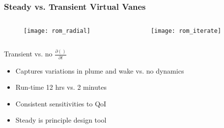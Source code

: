 \documentclass[mathserif]{beamer}
\begin{document}

%
%
\begin{frame}
 \frametitle{Steady vs. Transient Virtual Vanes}

 \begin{columns}[]
  \begin{column}{0.5\linewidth}

    \begin{figure}[htb]
     \centering
     \texttt{[image: rom\_radial]}
    \end{figure}

    \end{column}
  \begin{column}{0.5\linewidth}

    \begin{figure}[htb]
     \centering
     \texttt{[image: rom\_iterate]}
    \end{figure}

  \end{column}
 \end{columns}

 \begin{block}{Transient vs. no $\frac{\partial ()}{\partial t}$}
   \begin{itemize}
   \item Captures variations in plume and wake vs. no dynamics
   \item Run-time 12 hrs vs. 2 minutes
   \item Consistent sensitivities to QoI	
   \item Steady is principle design tool
   \end{itemize}
 \end{block}
 
\end{frame}
\end{document}
